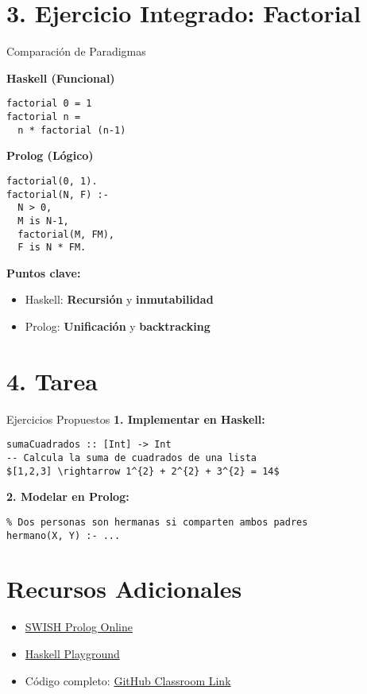 \documentclass[12pt]{article}
\begin{document}
\section*{3. Ejercicio Integrado: Factorial}
\begin{ejercicio}{Comparación de Paradigmas}
\begin{minipage}{0.48\textwidth}
\textbf{Haskell (Funcional)}
\begin{lstlisting}[style=haskell]
factorial 0 = 1
factorial n = 
  n * factorial (n-1)
\end{lstlisting}
\end{minipage}
\hfill
\begin{minipage}{0.48\textwidth}
\textbf{Prolog (Lógico)}
\begin{lstlisting}[style=prolog]
factorial(0, 1).
factorial(N, F) :- 
  N > 0, 
  M is N-1, 
  factorial(M, FM), 
  F is N * FM.
\end{lstlisting}
\end{minipage}

\vspace{1em}
\textbf{Puntos clave:}
\begin{itemize}
\item Haskell: \textbf{Recursión} y \textbf{inmutabilidad}
\item Prolog: \textbf{Unificación} y \textbf{backtracking}
\end{itemize}
\end{ejercicio}

\section*{4. Tarea}
\begin{ejercicio}{Ejercicios Propuestos}
\textbf{1. Implementar en Haskell:}
\begin{lstlisting}[style=haskell]
sumaCuadrados :: [Int] -> Int
-- Calcula la suma de cuadrados de una lista
$[1,2,3] \rightarrow 1^{2} + 2^{2} + 3^{2} = 14$
\end{lstlisting}

\textbf{2. Modelar en Prolog:}
\begin{lstlisting}[style=prolog]
% Regla "hermano" usando padre y madre
% Dos personas son hermanas si comparten ambos padres
hermano(X, Y) :- ...
\end{lstlisting}
\end{ejercicio}

\section*{Recursos Adicionales}
\begin{itemize}
\item \href{https://swish.swi-prolog.org/}{SWISH Prolog Online}
\item \href{https://play.haskell.org/}{Haskell Playground}
\item Código completo: \href{https://github.com/}{GitHub Classroom Link}
\end{itemize}
\end{document}
